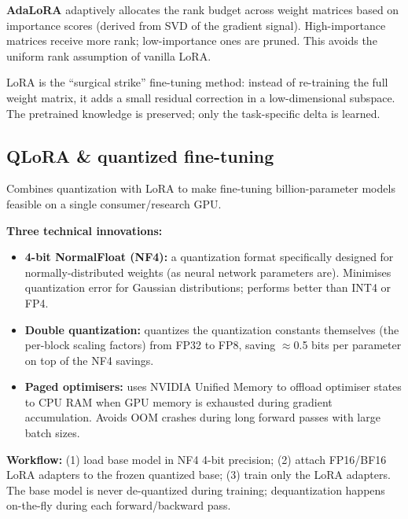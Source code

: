 \textbf{AdaLoRA} adaptively allocates the rank budget across weight matrices based on
importance scores (derived from SVD of the gradient signal). High-importance matrices
receive more rank; low-importance ones are pruned. This avoids the uniform rank
assumption of vanilla LoRA.

\begin{intuitionbox}
  LoRA is the ``surgical strike'' fine-tuning method: instead of re-training the
  full weight matrix, it adds a small residual correction in a low-dimensional
  subspace. The pretrained knowledge is preserved; only the task-specific delta is
  learned.
\end{intuitionbox}

\subsection{QLoRA \& quantized fine-tuning}

\begin{paperbox}[title={QLoRA (Dettmers et al.\ 2023)}]
  Combines quantization with LoRA to make fine-tuning billion-parameter models
  feasible on a single consumer/research GPU.
\end{paperbox}

\textbf{Three technical innovations:}

\begin{itemize}
  \item \textbf{4-bit NormalFloat (NF4):} a quantization format specifically designed
    for normally-distributed weights (as neural network parameters are). Minimises
    quantization error for Gaussian distributions; performs better than INT4 or FP4.

  \item \textbf{Double quantization:} quantizes the quantization constants themselves
    (the per-block scaling factors) from FP32 to FP8, saving $\approx$0.5 bits per
    parameter on top of the NF4 savings.

  \item \textbf{Paged optimisers:} uses NVIDIA Unified Memory to offload optimiser
    states to CPU RAM when GPU memory is exhausted during gradient accumulation.
    Avoids OOM crashes during long forward passes with large batch sizes.
\end{itemize}

\textbf{Workflow:} (1) load base model in NF4 4-bit precision; (2) attach FP16/BF16
LoRA adapters to the frozen quantized base; (3) train only the LoRA adapters. The
base model is never de-quantized during training; dequantization happens on-the-fly
during each forward/backward pass.


